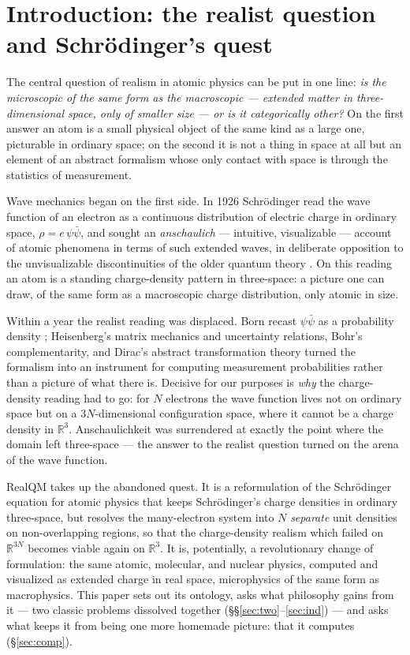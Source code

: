 \documentclass[11pt]{article}
\begin{document}

\section{Introduction: the realist question and Schr\"odinger's quest}
\label{sec:intro}

The central question of realism in atomic physics can be put in one line: \emph{is the microscopic of the
same form as the macroscopic --- extended matter in three-dimensional space, only of smaller size --- or is
it categorically other?} On the first answer an atom is a small physical object of the same kind as a large
one, picturable in ordinary space; on the second it is not a thing in space at all but an element of an
abstract formalism whose only contact with space is through the statistics of measurement.

Wave mechanics began on the first side. In 1926 Schr\"odinger read the wave function of an electron as a
continuous distribution of electric charge in ordinary space, $\rho=e\,\psi\bar\psi$, and sought an
\emph{anschaulich} --- intuitive, visualizable --- account of atomic phenomena in terms of such extended
waves, in deliberate opposition to the unvisualizable discontinuities of the older quantum theory
\cite{Schrodinger1926,deRegt1997}. On this reading an atom is a standing charge-density pattern in
three-space: a picture one can draw, of the same form as a macroscopic charge distribution, only atomic in
size.

Within a year the realist reading was displaced. Born recast $\psi\bar\psi$ as a probability density
\cite{Born1926}; Heisenberg's matrix mechanics and uncertainty relations, Bohr's complementarity, and
Dirac's abstract transformation theory turned the formalism into an instrument for computing measurement
probabilities rather than a picture of what there is. Decisive for our purposes is \emph{why} the
charge-density reading had to go: for $N$ electrons the wave function lives not on ordinary space but on a
$3N$-dimensional configuration space, where it cannot be a charge density in $\mathbb R^3$. Anschaulichkeit
was surrendered at exactly the point where the domain left three-space --- the answer to the realist
question turned on the arena of the wave function.

RealQM \cite{RealQM} takes up the abandoned quest. It is a reformulation of the Schr\"odinger equation for
atomic physics that keeps Schr\"odinger's charge densities in ordinary three-space, but resolves the
many-electron system into $N$ \emph{separate} unit densities on non-overlapping regions, so that the
charge-density realism which failed on $\mathbb R^{3N}$ becomes viable again on $\mathbb R^3$. It is,
potentially, a revolutionary change of formulation: the same atomic, molecular, and nuclear physics,
computed and visualized as extended charge in real space, microphysics of the same form as macrophysics.
This paper sets out its ontology, asks what philosophy gains from it --- two classic problems dissolved
together (\S\S\ref{sec:two}--\ref{sec:ind}) --- and asks what keeps it from being one more homemade picture:
that it computes (\S\ref{sec:comp}).
\end{document}
